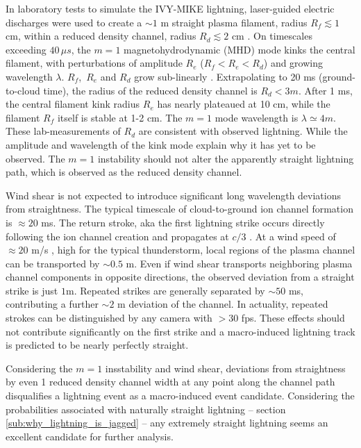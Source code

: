 \documentclass[%
 reprint,
 amsmath,amssymb,
 aps,
]{revtex4-2}
\begin{document}
        In laboratory tests to simulate the IVY-MIKE lightning, laser-guided electric discharges were used to create a ${\sim 1}$ m straight plasma filament, radius $R_f\lesssim 1$ cm, within a reduced density channel, radius $R_d \lesssim 2$ cm \citep[][fig. 6]{IVY-MIKE1987}. On timescales exceeding $40 \, \mu s$, the $m=1$ magnetohydrodynamic (MHD) mode kinks the central filament, with perturbations of amplitude $R_e$ ($R_f < R_e < R_d$) and growing wavelength $\lambda$. $R_f$,\, $R_e$ and $R_d$ grow sub-linearly \citep[][fig. 9]{IVY-MIKE1987}. Extrapolating to 20 ms (ground-to-cloud time), the radius of the reduced density channel is $R_d<3m$. After 1 ms, the central filament kink radius $R_e$ has nearly plateaued at 10 cm, while the filament $R_f$ itself is stable at 1-2 cm. The $m=1$ mode wavelength is $\lambda\simeq4 m$. These lab-measurements of $R_d$ are consistent with observed lightning. While the amplitude and wavelength of the kink mode explain why it has yet to be observed. The $m=1$ instability should not alter the apparently straight lightning path, which is observed as the reduced density channel.

        Wind shear is not expected to introduce significant long wavelength deviations from straightness. The typical timescale of cloud-to-ground ion channel formation is ${\approx 20}$ ms. The return stroke, aka the first lightning strike \citep{DwyerUman2014} occurs directly following the ion channel creation and propagates at $c/3$ \citep{Idone1987}. At a wind speed of ${\approx 20}$ m/s \citep{Choi2004}, high for the typical thunderstorm, local regions of the plasma channel can be transported by ${\sim 0.5}$ m. Even if wind shear transports neighboring plasma channel components in opposite directions, the observed deviation from a straight strike is just $1$m. Repeated strikes are generally separated by ${\sim 50}$ ms, contributing a further ${\sim 2}$ m deviation of the channel. In actuality, repeated strokes can be distinguished by any camera with $>30$ fps. These effects should not contribute significantly on the first strike and a macro-induced lightning track is predicted to be nearly perfectly straight.

        Considering the $m=1$ insstability and wind shear, deviations from straightness by even 1 reduced density channel width at any point along the channel path disqualifies a lightning event as a macro-induced event candidate. Considering the probabilities associated with naturally straight lightning -- section \ref{sub:why_lightning_is_jagged} -- any extremely straight lightning seems an excellent candidate for further analysis.
\end{document}
